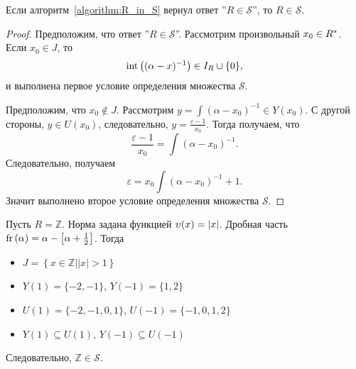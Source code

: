 \documentclass[_00_dissertation.tex]{subfiles}
\begin{document}
\begin{lemma}
    Если алгоритм~\ref{algorithm:R_in_S} вернул ответ ''$R \in \mathcal{S}$'', то $R \in \mathcal{S}$.
\end{lemma}
\begin{proof}
    Предположим, что ответ ''$R \in \mathcal{S}$''.
    Рассмотрим произвольный $x_0 \in R^{*}$.
    Если $x_0 \in J$, то
    \begin{equation*}
        \textrm{int}\left((\alpha - x)^{-1}\right) \in I_{R} \cup \{0\},
    \end{equation*}
    и выполнена первое условие определения множества $\mathcal{S}$.
    
    Предположим, что $x_0 \not\in J$.
    Рассмотрим $y = \int{(\alpha - x_0)^{-1}} \in Y(x_0)$.
    С другой стороны, $y \in U(x_0)$, следовательно, $y = \frac{\varepsilon - 1}{x_0}$.
    Тогда получаем, что
    \begin{equation*}
        \frac{\varepsilon - 1}{x_0} = \int{(\alpha - x_0)^{-1}}.
    \end{equation*}
    Следовательно, получаем
    \begin{equation*}
        \varepsilon = x_0 \int{(\alpha - x_0)^{-1}} + 1.
    \end{equation*}
    Значит выполнено второе условие определения множества $\mathcal{S}$.
\end{proof}

\begin{example}\label{example:Z}
    Пусть $R = \mathbb{Z}$.
    Норма задана функцией $\upsilon(x) = |x|$.
    Дробная часть $\textrm{fr}\left(\alpha\right) = \alpha - \left[\alpha + \frac{1}{2}\right]$.
    Тогда
    \begin{itemize}
        \item $J = \left\{x \in \mathbb{Z} \big| |x| > 1\right\}$
        
        \item $Y(1) = \{-2, -1\}$, $Y(-1) = \{1, 2\}$
        
        \item $U(1) = \{-2, -1, 0, 1\}$, $U(-1) = \{-1, 0, 1, 2\}$
        
        \item $Y(1) \subseteq U(1)$, $Y(-1) \subseteq U(-1)$
    \end{itemize}
    
    Следовательно, $\mathbb{Z} \in \mathcal{S}$.
\end{example}
\end{document}
